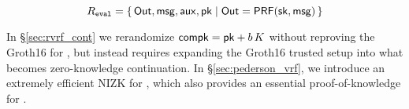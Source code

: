 $$ \Reval = \Setst{ \Out, \msg, \aux, \pk }{ \Out = \PRF(\sk,\msg) } $$

In \S\ref{sec:rvrf_cont} we rerandomize $\mathsf{compk} = \mathsf{pk} + b \, K$
without reproving the Groth16 for \Rring, but instead requires
expanding the Groth16 trusted setup into what becomes zero-knowledge continuation.
%
In \S\ref{sec:pederson_vrf}, we introduce an extremely efficient NIZK
for \Reval, which also provides an essential proof-of-knowledge for \compk.




\endinput





Ring VRFs are firstly ring signatures broadly interpreted, in that they
prove an involved public key lies inside some commitment \comring to
the plausible signer set, known as the ring.
Anyone could compute \comring from this set of public keys.
%
At the same time, ring VRFs prove correct output of a PRF keyed by
the signer's actual secret key, and evaluated on a supplied message \msg,
which then links ring VRF signatures on the same \msg.

\smallskip
